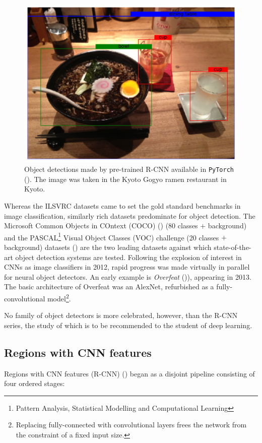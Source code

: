 \begin{figure}[h]
\centering
\includegraphics[width=\textwidth]{img/rcnn_ramen.pdf}
\caption{Object detections made by pre-trained R-CNN available in \texttt{PyTorch} (\cite{paszke2017automatic}). The image was taken in the Kyoto Gogyo ramen restaurant in Kyoto.}
\label{fig:rcnn_ramen}
\end{figure}

Whereas the ILSVRC datasets came to set the gold standard benchmarks in image classification, similarly rich datasets predominate for object detection. The Microsoft Common Objects in COntext (COCO) (\cite{lin2014microsoft}) (80 classes $+$ background) and the PASCAL\footnote{Pattern Analysis, Statistical Modelling and Computational Learning} Visual Object Classes (VOC) challenge (20 classes $+$ background) datasets (\cite{everingham2010pascal}) are the two leading datasets against which state-of-the-art object detection systems are tested.  Following the explosion of interest in CNNs as image classifiers in 2012, rapid progress was made virtually in parallel for neural object detectors. An early example is \emph{Overfeat} (\cite{sermanet2013overfeat})), appearing in 2013. The basic architecture of Overfeat was an AlexNet, refurbished as a fully-convolutional model\footnote{Replacing fully-connected with convolutional layers frees the network from the constraint of a fixed input size.}. 

No family of object detectors is more celebrated, however, than the R-CNN series, the study of which is to be recommended to the student of deep learning.

\subsection{Regions with CNN features}
\label{subsec:rcnn_definition}
Regions with CNN features (R-CNN) (\cite{girshick2014rich}) began as a disjoint pipeline consisting of four ordered stages:

